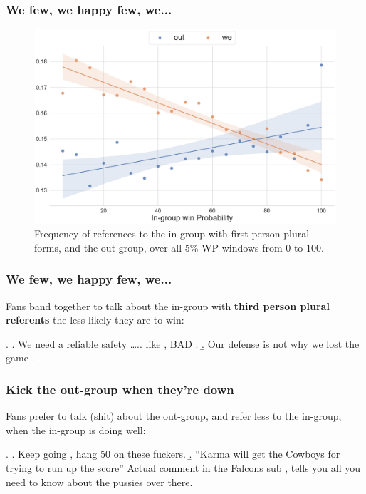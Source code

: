 \begin{frame}[c]\frametitle{We few, we happy few, we...}
    \pause
    \begin{figure}[t]
         \centering
         \includegraphics[width=0.85\linewidth]{figures/trends-3.png}
         \caption{Frequency of references to the in-group with first person plural forms, and the out-group, over all 5\% WP windows from 0 to 100.}
         \label{fig:trends-3}
     \end{figure}    
\end{frame}

\begin{frame}[c]\frametitle{We few, we happy few, we...}
    
    Fans band together to talk about the in-group with \textbf{third person plural referents} the less likely they are to win:

    \ex. \a. \alert{We} need a reliable safety ….. like , BAD .
         \b. \alert{Our defense} is not why \alert{we} lost the game . 

\end{frame}

\begin{frame}[c]\frametitle{Kick the out-group when they're down}

    Fans prefer to talk (shit) about the out-group, and refer less to the in-group, when the in-group is doing well:
    
    \ex. \a.  Keep going , hang 50 on \alert{these fuckers}.
         \b. ``Karma will get the Cowboys for trying to run up the score'' Actual comment in \alert{the Falcons} sub , tells you all you need to know about \alert{the pussies} over there.

\end{frame}

